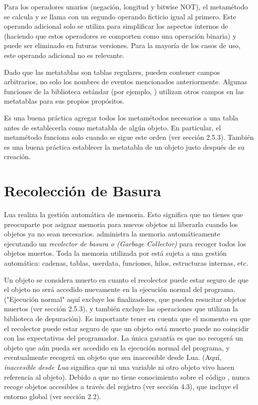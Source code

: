 Para los operadores unarios (negación, longitud y bitwise NOT), el metamétodo se calcula y se llama con un segundo operando ficticio igual al primero. Este operando adicional solo se utiliza para simplificar los aspectos internos de  (haciendo que estos operadores se comporten como una operación binaria) y puede ser eliminado en futuras versiones. Para la mayoría de los casos de uso, este operando adicional no es relevante.

Dado que las metatablas son tablas regulares, pueden contener campos arbitrarios, no solo los nombres de eventos mencionados anteriormente. Algunas funciones de la biblioteca estándar (por ejemplo, ) utilizan otros campos en las metatablas para sus propios propósitos.

Es una buena práctica agregar todos los metamétodos necesarios a una tabla antes de establecerla como metatabla de algún objeto. En particular, el metamétodo  funciona solo cuando se sigue este orden (ver sección 2.5.3). También es una buena práctica establecer la metatabla de un objeto justo después de su creación.

\section{Recolección de Basura}

Lua realiza la gestión automática de memoria. Esto significa que no tienes que preocuparte por asignar memoria para nuevos objetos ni liberarla cuando los objetos ya no sean necesarios.  administra la memoria automáticamente ejecutando un \emph{recolector de basura o (Garbage Collector)} para recoger todos los objetos muertos. Toda la memoria utilizada por  está sujeta a una gestión automática: cadenas, tablas, userdata, funciones, hilos, estructuras internas, etc.

Un objeto se considera muerto en cuanto el recolector puede estar seguro de que el objeto no será accedido nuevamente en la ejecución normal del programa. ("Ejecución normal" aquí excluye los finalizadores, que pueden resucitar objetos muertos (ver sección 2.5.3), y también excluye las operaciones que utilizan la biblioteca de depuración). Es importante tener en cuenta que el momento en que el recolector puede estar seguro de que un objeto está muerto puede no coincidir con las expectativas del programador. La única garantía es que  no recogerá un objeto que aún pueda ser accedido en la ejecución normal del programa, y eventualmente recogerá un objeto que sea inaccesible desde Lua. (Aquí, \emph{inaccesible desde Lua} significa que ni una variable ni otro objeto vivo hacen referencia al objeto). Debido a que  no tiene conocimiento sobre el código , nunca recoge objetos accesibles a través del registro (ver sección 4.3), que incluye el entorno global (ver sección 2.2).

